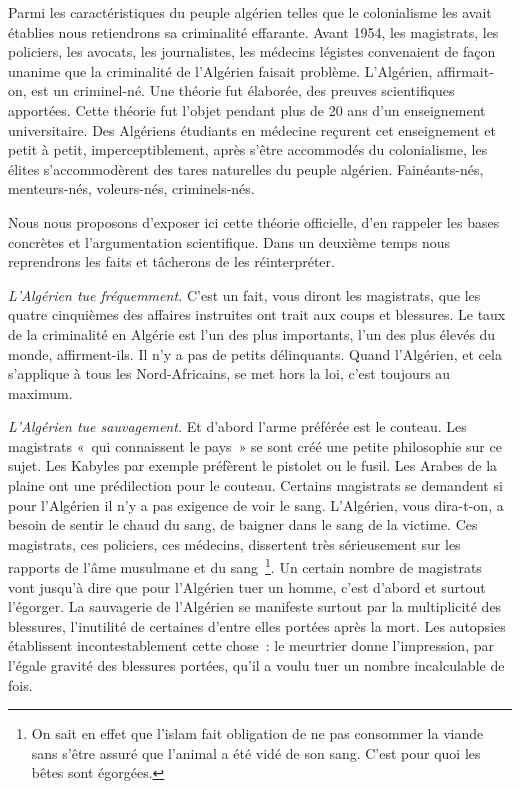 \documentclass[french,twoside]{book} %
\begin{document}
Parmi les caractéristiques du peuple algérien telles que le colonialisme les avait établies nous retiendrons sa criminalité effarante. Avant 1954, les magistrats, les policiers, les avocats, les journalistes, les médecins légistes convenaient de façon unanime que la criminalité de l’Algérien faisait problème. L’Algérien, affirmait-on, est un criminel-né. Une théorie fut élaborée, des preuves scientifiques apportées. Cette théorie fut l’objet pendant plus de 20 ans d’un enseignement universitaire. Des Algériens étudiants en médecine reçurent cet enseignement et petit à petit, imperceptiblement, après s’être accommodés du colonialisme, les élites s’accommodèrent des tares naturelles du peuple algérien. Fainéants-nés, menteurs-nés, voleurs-nés, criminels-nés.\par
Nous nous proposons d’exposer ici cette théorie officielle, d’en rappeler les bases concrètes et l’argumentation scientifique.   Dans un deuxième temps nous reprendrons les faits et tâcherons de les réinterpréter.\par
\emph{L’Algérien tue fréquemment.} C’est un fait, vous diront les magistrats, que les quatre cinquièmes des affaires instruites ont trait aux coups et blessures. Le taux de la criminalité en Algérie est l’un des plus importants, l’un des plus élevés du monde, affirment-ils. Il n’y a pas de petits délinquants. Quand l’Algérien, et cela s’applique à tous les Nord-Africains, se met hors la loi, c’est toujours au maximum.\par
\emph{L’Algérien tue sauvagement.} Et d’abord l’arme préférée est le couteau. Les magistrats « qui connaissent le pays » se sont créé une petite philosophie sur ce sujet. Les Kabyles par exemple préfèrent le pistolet ou le fusil. Les Arabes de la plaine ont une prédilection pour le couteau. Certains magistrats se demandent si pour l’Algérien il n’y a pas exigence de voir le sang. L’Algérien, vous dira-t-on, a besoin de sentir le chaud du sang, de baigner dans le sang de la victime. Ces magistrats, ces policiers, ces médecins, dissertent très sérieusement sur les rapports de l’âme musulmane et du sang \footnote{On sait en effet que l’islam fait obligation de ne pas consommer la viande sans s’être assuré que l’animal a été vidé de son sang. C’est pour quoi les bêtes sont égorgées.}. Un certain nombre de magistrats vont jusqu’à dire que pour l’Algérien tuer un homme, c’est d’abord et surtout l’égorger. La sauvagerie de l’Algérien se manifeste surtout par la multiplicité des blessures, l’inutilité de certaines d’entre elles portées après la mort. Les autopsies établissent incontestablement cette chose : le meurtrier donne l’impression, par l’égale gravité des blessures portées, qu’il a voulu tuer un nombre incalculable de fois.\par
\end{document}

